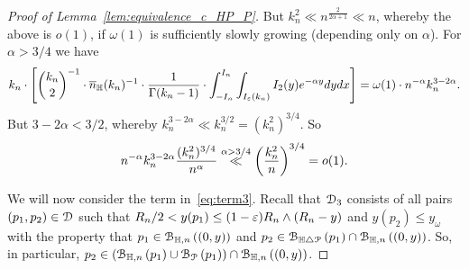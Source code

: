 \begin{proof}[Proof of Lemma~\ref{lem:equivalence_c_HP_P}]
But $k_n^2 \ll n^{\frac{2}{2\alpha +1}}  \ll n$, whereby the above is $o(1)$, if $\omega (1)$ is 
sufficiently slowly growing (depending only on $\alpha$).  
For $\alpha >3/4$ we have 
$$k_n \cdot \left[{k_n \choose 2}^{-1} \cdot \overline{n}_{\mathbb{H}}(k_n)^{-1} \cdot 
\frac{1}{\Gamma (k_n-1)} \cdot \int_{-I_n}^{I_n} \int_{I_{\varepsilon} (k_n)}  I_2 (y) e^{-\alpha y} dy dx \right] 
=\omega(1) \cdot n^{-\alpha} k_n^{3-2\alpha}.$$
But $3 -2\alpha < 3/2$, whereby $k_n^{3-2\alpha} \ll k_n^{3/2} = (k_n^2 )^{3/4}$. 
So 
$$ n^{-\alpha} k_n^{3-2\alpha} \\ \frac{(k_n^2)^{3/4}}{n^{\alpha}} \stackrel{\alpha >3/4}{\ll} \left( \frac{k_n^2}{n}\right)^{3/4} =o(1).$$

We will now consider the term in~\eqref{eq:term3}. 
Recall that $\mathcal{D}_{3}$ consists of all pairs $(p_1, p_2 ) \in \mathcal{D}_{}$ such that $R_n/2 < y(p_1) \leq (1-\varepsilon)R_n \wedge (R_n-y)$ and $y(p_2) \leq y_\omega$ with the property that 
$p_1 \in {\mathcal B}_{\mathbb{H},n}\left((0,y)\right)$ and $p_2 \in {\mathcal B}_{\mathbb{H} \bigtriangleup {\mathcal P}}\left(p_1\right) \cap {\mathcal B}_{\mathbb{H},n}\left((0,y)\right)$.    
So, in particular, $p_2 \in ({\mathcal B}_{\mathbb{H},n}\left(p_1\right) \cup {\mathcal B}_{{\mathcal P}}\left(p_1\right)) \cap {\mathcal B}_{\mathbb{H},n}\left((0,y)\right)$.


\end{proof}
